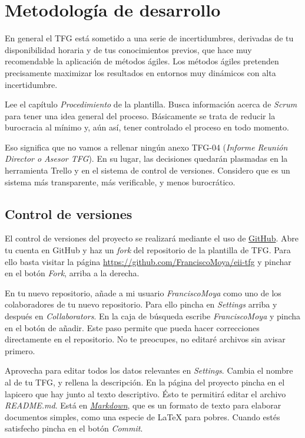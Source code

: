 \section{Metodología de desarrollo}

En general el TFG está sometido a una serie de incertidumbres, derivadas de tu disponibilidad horaria y de tus conocimientos previos, que hace muy recomendable la aplicación de métodos ágiles.  Los métodos ágiles pretenden precisamente maximizar los resultados en entornos muy dinámicos con alta incertidumbre.

Lee el capítulo \emph{Procedimiento} de la plantilla.  Busca información acerca de \emph{Scrum} para tener una idea general del proceso.  Básicamente se trata de reducir la burocracia al mínimo y, aún así, tener controlado el proceso en todo momento.

Eso significa que no vamos a rellenar ningún anexo TFG-04 (\emph{Informe Reunión Director o Asesor TFG}).  En su lugar, las decisiones quedarán plasmadas en la herramienta Trello y en el sistema de control de versiones.  Considero que es un sistema más transparente, más verificable, y menos burocrático.

\subsection{Control de versiones}
\label{sec:control-versiones}

El control de versiones del proyecto se realizará mediante el uso de \href{https://github.com}{GitHub}.  Abre tu cuenta en 
GitHub y haz un \emph{fork} del repositorio de la plantilla de TFG.  Para ello basta visitar la página \url{https://github.com/FranciscoMoya/eii-tfg} y pinchar en el botón \emph{Fork}, arriba a la derecha.  

En tu nuevo repositorio, añade a mi usuario \emph{FranciscoMoya} como uno de los colaboradores de tu nuevo repositorio.  Para ello pincha en \emph{Settings} arriba y después en \emph{Collaborators}. En la caja de búsqueda escribe \emph{FranciscoMoya} y pincha en el botón de añadir.  Este paso permite que pueda hacer correcciones directamente en el repositorio.  No te preocupes, no editaré archivos sin avisar primero.

Aprovecha para editar todos los datos relevantes en \emph{Settings}.  Cambia el nombre al de tu TFG, y rellena la descripción.  En la página del proyecto pincha en el lapicero que hay junto al texto descriptivo.  Ésto te permitirá editar el archivo \emph{README.md}.  Está en \href{https://github.com/adam-p/markdown-here/wiki/Markdown-Cheatsheet}{\emph{Markdown}}, que es un formato de texto para elaborar documentos simples, como una especie de \LaTeX{} para pobres.  Cuando estés satisfecho pincha en el botón \emph{Commit}.

